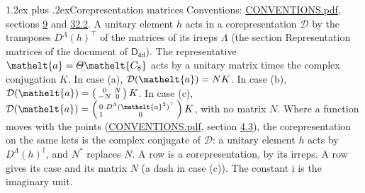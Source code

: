 \documentclass[10pt,a4paper]{article}
\makeatletter
\renewcommand\section{\@startsection{section}{1}{\z@}{-3ex plus -1ex minus -.2ex}%
  {1.2ex plus .2ex}{\normalfont\large\sffamily\bfseries\color{parttitle}}}
\numberwithin{equation}{section}
\newcommand{\eltfont}[1]{{\let\sigma\eltsigma\mathelt{#1}}}
\newcommand{\grp}[1]{\mathsf{#1}}
\newcommand{\elt}[1]{\eltfont{#1}}
\newcommand{\iunit}{\mathrm{i}}
\makeatother
\begin{document}
\section{Corepresentation matrices}\label{s:corep_matrices}
Conventions: \href{../../CONVENTIONS.pdf}{CONVENTIONS.pdf}, sections \href{../../../rotation/CONVENTIONS.pdf\#conv.9}{9} and \href{../../CONVENTIONS.pdf\#conv.32.2}{32.2}.
A unitary element $h$ acts in a corepresentation $\mathcal{D}$ by the transposes $D^{\Lambda}(h)^{\top}$ of the matrices of its irreps $\Lambda$ (the section Representation matrices of the document of \href{../../../rotation/data/pdf/D4d.pdf}{$\grp{D_{4d}}$}). The representative $\elt{a} = \varTheta\elt{C_{8}}$ acts by a unitary matrix times the complex conjugation $K$.
In case (a), $\mathcal{D}(\elt{a}) = NK$. In case (b), $\mathcal{D}(\elt{a}) = \left(\begin{smallmatrix} 0 & N \\ -N & 0 \end{smallmatrix}\right) K$. In case (c), $\mathcal{D}(\elt{a}) = \left(\begin{smallmatrix} 0 & D^{\Lambda}(\elt{a}^2)^{\top} \\ 1 & 0 \end{smallmatrix}\right) K$, with no matrix $N$.
Where a function moves with the points (\href{../../CONVENTIONS.pdf}{CONVENTIONS.pdf}, section \href{../../../rotation/CONVENTIONS.pdf\#conv.4.3}{4.3}), the corepresentation on the same kets is the complex conjugate of $\mathcal{D}$: a unitary element $h$ acts by $D^{\Lambda}(h)^{\dagger}$, and $N^{*}$ replaces $N$.
A row is a corepresentation, by its irreps. A row gives its case and its matrix $N$ (a dash in case (c)).
The constant $\iunit$ is the imaginary unit.
\end{document}
